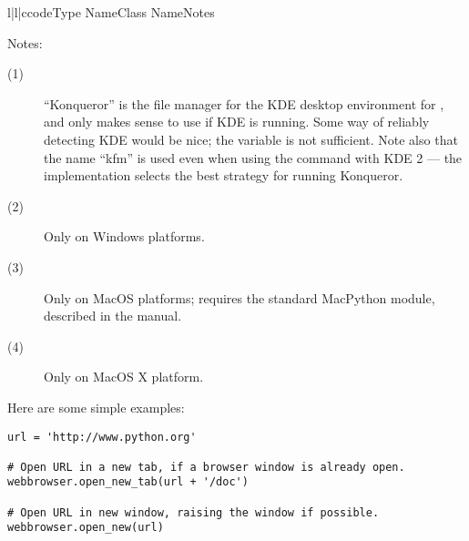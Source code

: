 \begin{tableiii}{l|l|c}{code}{Type Name}{Class Name}{Notes}
\end{tableiii}

\noindent
Notes:

\begin{description}
\item[(1)]
``Konqueror'' is the file manager for the KDE desktop environment for
\UNIX{}, and only makes sense to use if KDE is running.  Some way of
reliably detecting KDE would be nice; the  variable is
not sufficient.  Note also that the name ``kfm'' is used even when
using the  command with KDE 2 --- the
implementation selects the best strategy for running Konqueror.

\item[(2)]
Only on Windows platforms.

\item[(3)]
Only on MacOS platforms; requires the standard MacPython 
module, described in the  manual.

\item[(4)]
Only on MacOS X platform.
\end{description}

Here are some simple examples:

\begin{verbatim}
url = 'http://www.python.org'

# Open URL in a new tab, if a browser window is already open. 
webbrowser.open_new_tab(url + '/doc')

# Open URL in new window, raising the window if possible.
webbrowser.open_new(url)
\end{verbatim}


